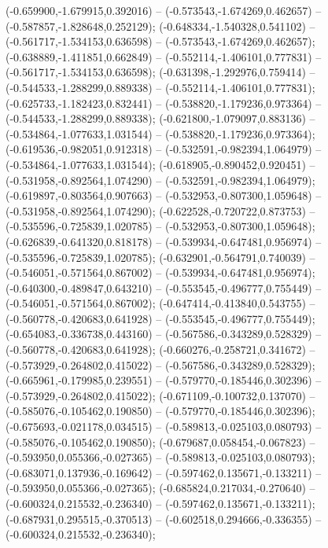  (-0.659900,-1.679915,0.392016) -- (-0.573543,-1.674269,0.462657) -- (-0.587857,-1.828648,0.252129);
 (-0.648334,-1.540328,0.541102) -- (-0.561717,-1.534153,0.636598) -- (-0.573543,-1.674269,0.462657);
 (-0.638889,-1.411851,0.662849) -- (-0.552114,-1.406101,0.777831) -- (-0.561717,-1.534153,0.636598);
 (-0.631398,-1.292976,0.759414) -- (-0.544533,-1.288299,0.889338) -- (-0.552114,-1.406101,0.777831);
 (-0.625733,-1.182423,0.832441) -- (-0.538820,-1.179236,0.973364) -- (-0.544533,-1.288299,0.889338);
 (-0.621800,-1.079097,0.883136) -- (-0.534864,-1.077633,1.031544) -- (-0.538820,-1.179236,0.973364);
 (-0.619536,-0.982051,0.912318) -- (-0.532591,-0.982394,1.064979) -- (-0.534864,-1.077633,1.031544);
 (-0.618905,-0.890452,0.920451) -- (-0.531958,-0.892564,1.074290) -- (-0.532591,-0.982394,1.064979);
 (-0.619897,-0.803564,0.907663) -- (-0.532953,-0.807300,1.059648) -- (-0.531958,-0.892564,1.074290);
 (-0.622528,-0.720722,0.873753) -- (-0.535596,-0.725839,1.020785) -- (-0.532953,-0.807300,1.059648);
 (-0.626839,-0.641320,0.818178) -- (-0.539934,-0.647481,0.956974) -- (-0.535596,-0.725839,1.020785);
 (-0.632901,-0.564791,0.740039) -- (-0.546051,-0.571564,0.867002) -- (-0.539934,-0.647481,0.956974);
 (-0.640300,-0.489847,0.643210) -- (-0.553545,-0.496777,0.755449) -- (-0.546051,-0.571564,0.867002);
 (-0.647414,-0.413840,0.543755) -- (-0.560778,-0.420683,0.641928) -- (-0.553545,-0.496777,0.755449);
 (-0.654083,-0.336738,0.443160) -- (-0.567586,-0.343289,0.528329) -- (-0.560778,-0.420683,0.641928);
 (-0.660276,-0.258721,0.341672) -- (-0.573929,-0.264802,0.415022) -- (-0.567586,-0.343289,0.528329);
 (-0.665961,-0.179985,0.239551) -- (-0.579770,-0.185446,0.302396) -- (-0.573929,-0.264802,0.415022);
 (-0.671109,-0.100732,0.137070) -- (-0.585076,-0.105462,0.190850) -- (-0.579770,-0.185446,0.302396);
 (-0.675693,-0.021178,0.034515) -- (-0.589813,-0.025103,0.080793) -- (-0.585076,-0.105462,0.190850);
 (-0.679687,0.058454,-0.067823) -- (-0.593950,0.055366,-0.027365) -- (-0.589813,-0.025103,0.080793);
 (-0.683071,0.137936,-0.169642) -- (-0.597462,0.135671,-0.133211) -- (-0.593950,0.055366,-0.027365);
 (-0.685824,0.217034,-0.270640) -- (-0.600324,0.215532,-0.236340) -- (-0.597462,0.135671,-0.133211);
 (-0.687931,0.295515,-0.370513) -- (-0.602518,0.294666,-0.336355) -- (-0.600324,0.215532,-0.236340);
